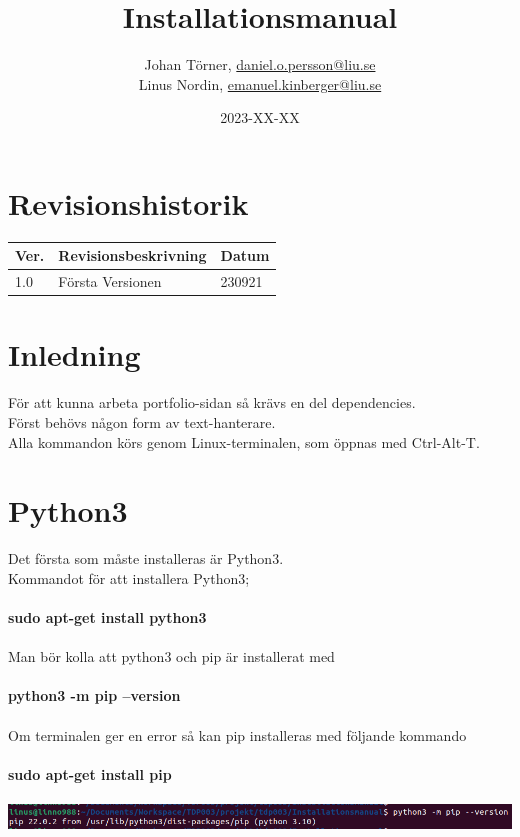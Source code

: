 \documentclass{TDP003mall}
\author{Johan Törner, \url{daniel.o.persson@liu.se}\\
  Linus Nordin, \url{emanuel.kinberger@liu.se}\\}
\title{Installationsmanual}
\date{2023-XX-XX}
\begin{document}
\graphicspath{ {./images/} }
\usepackage{graphicx}
\projectpage
\section{Revisionshistorik}
\begin{table}[!h]
\begin{tabularx}{\linewidth}{|l|X|l|}
\hline
Ver. & Revisionsbeskrivning & Datum \\\hline
1.0 & Första Versionen & 230921 \\\hline
\end{tabularx}
\end{table}


\section{Inledning}
För att kunna arbeta portfolio-sidan så krävs en del dependencies.\\
Först behövs någon form av text-hanterare.\\

Alla kommandon körs genom Linux-terminalen, som öppnas med Ctrl-Alt-T.\\

\section{Python3}
Det första som måste installeras är Python3.\\ 
Kommandot för att installera Python3;\\\\
\textbf{sudo apt-get install python3}\\\\
Man bör kolla att python3 och pip är installerat med\\\\
\textbf{python3 -m pip --version}\\\\
Om terminalen ger en error så kan pip installeras med följande kommando\\\\
\textbf{sudo apt-get install pip}\\\\
\includegraphics[scale=0.5]{pip_version}
\end{document}
